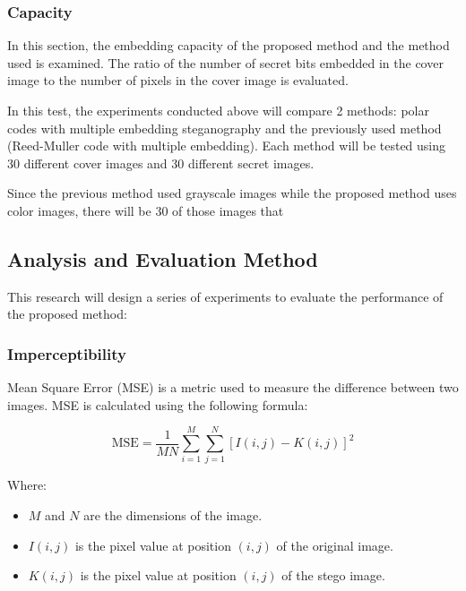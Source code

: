 \documentclass{ittelkom}
\begin{document}
\subsubsection{Capacity}

In this section, the embedding capacity of the proposed method and the method
used is examined. The ratio of the number of secret bits embedded in the cover
image to the number of pixels in the cover image is evaluated.

In this test, the experiments conducted above will compare 2 methods: polar
codes with multiple embedding steganography and the previously used method
(Reed-Muller code with multiple embedding). Each method will be tested using 30
different cover images and 30 different secret images.

Since the previous method used grayscale images while the proposed method uses
color images, there will be 30 of those images that

\subsection{Analysis and Evaluation Method}

This research will design a series of experiments to evaluate the performance
of the proposed method:

\subsubsection{Imperceptibility}


Mean Square Error (MSE) is a metric used to measure the difference between two
images. MSE is calculated using the following formula:

\begin{equation}
    \text{MSE} = \frac{1}{MN} \sum_{i=1}^{M} \sum_{j=1}^{N} [I(i,j) - K(i,j)]^2
\end{equation}

Where:
\begin{itemize}
    \item $M$ and $N$ are the dimensions of the image.
    \item $I(i,j)$ is the pixel value at position $(i,j)$ of the original image.
    \item $K(i,j)$ is the pixel value at position $(i,j)$ of the stego image.
\end{itemize}
\end{document}
